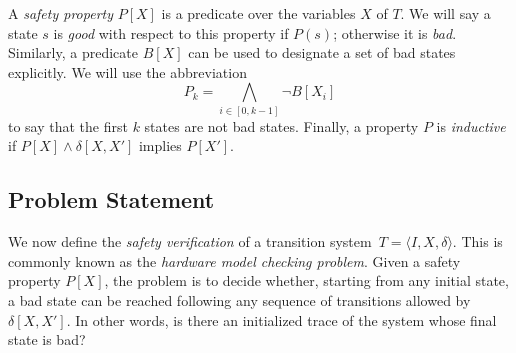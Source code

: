 A \textit{safety property} $P[X]$ is a predicate over the variables $X$ of $T$.  We will 
say a state $s$ is \textit{good} with respect to this property if $P(s)$; otherwise it is \textit{bad}. Similarly, a predicate $B[X]$ can be used to designate a set of bad states explicitly. 
We will use the abbreviation \[P_k = \underset{i \in [0,k-1]}{\bigwedge} \neg B[X_i]\]
to say that the  first $k$ states are not bad states.  Finally, a property $P$ is \textit{inductive} if $P[X] \wedge \delta[X,X']$ implies $P[X']$.    

%  



\subsection{Problem Statement} 
%
We now define the \textit{safety verification} of a transition system~$T = \langle I,X,\delta\rangle$.
This is commonly known as the \textit{hardware model checking problem}.  
Given a safety property $P[X]$, the problem is to decide whether, starting from any initial state, a bad state can be reached following any sequence of transitions allowed by $\delta[X,X']$. In other words, is there an initialized trace of the system whose final state is bad?

